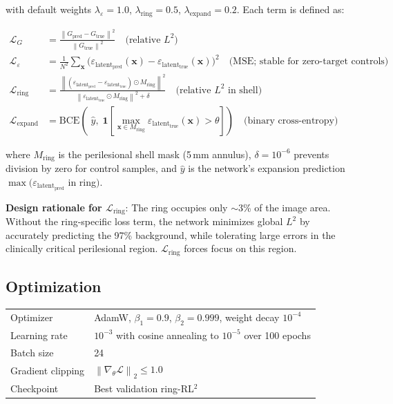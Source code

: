 \documentclass[11pt,letterpaper]{article}
\newcommand{\xvec}{\bm{x}}
\newcommand{\eps}{\varepsilon_{\mathrm{latent}}}
\newcommand{\norm}[1]{\left\|#1\right\|}
\begin{document}
with default weights $\lambda_\varepsilon = 1.0$, $\lambda_{\mathrm{ring}} = 0.5$,
$\lambda_{\mathrm{expand}} = 0.2$. Each term is defined as:

\begin{align*}
    \mathcal{L}_G &= \frac{\norm{G_{\mathrm{pred}} - G_{\mathrm{true}}}^2}{\norm{G_{\mathrm{true}}}^2} \quad \text{(relative $L^2$)} \\[6pt]
    \mathcal{L}_\varepsilon &= \frac{1}{N^2}\sum_{\xvec}\bigl(\eps_{\mathrm{pred}}(\xvec) - \eps_{\mathrm{true}}(\xvec)\bigr)^2 \quad \text{(MSE; stable for zero-target controls)} \\[6pt]
    \mathcal{L}_{\mathrm{ring}} &= \frac{\norm{(\eps_{\mathrm{pred}} - \eps_{\mathrm{true}}) \odot M_{\mathrm{ring}}}^2}{\norm{\eps_{\mathrm{true}} \odot M_{\mathrm{ring}}}^2 + \delta} \quad \text{(relative $L^2$ in shell)} \\[6pt]
    \mathcal{L}_{\mathrm{expand}} &= \mathrm{BCE}\!\left(\;\hat{y},\; \mathbf{1}\left[\max_{\xvec \in M_{\mathrm{ring}}} \eps_{\mathrm{true}}(\xvec) > \theta\right]\right) \quad \text{(binary cross-entropy)}
\end{align*}

where $M_{\mathrm{ring}}$ is the perilesional shell mask (5\,mm annulus), $\delta = 10^{-6}$
prevents division by zero for control samples, and $\hat{y}$ is the network's expansion
prediction $\max(\eps_{\mathrm{pred}}$ in ring$)$.

\textbf{Design rationale for $\mathcal{L}_{\mathrm{ring}}$}: The ring occupies only
$\sim$3\% of the image area. Without the ring-specific loss term, the network minimizes
global $L^2$ by accurately predicting the 97\% background, while tolerating large errors
in the clinically critical perilesional region. $\mathcal{L}_{\mathrm{ring}}$ forces
focus on this region.

\subsection{Optimization}

\begin{center}
\begin{tabular}{ll}
\toprule
Optimizer & AdamW, $\beta_1 = 0.9$, $\beta_2 = 0.999$, weight decay $10^{-4}$ \\
Learning rate & $10^{-3}$ with cosine annealing to $10^{-5}$ over 100 epochs \\
Batch size & 24 \\
Gradient clipping & $\norm{\nabla_\theta \mathcal{L}}_2 \leq 1.0$ \\
Checkpoint & Best validation ring-RL$^2$ \\
\bottomrule
\end{tabular}
\end{center}
\end{document}
